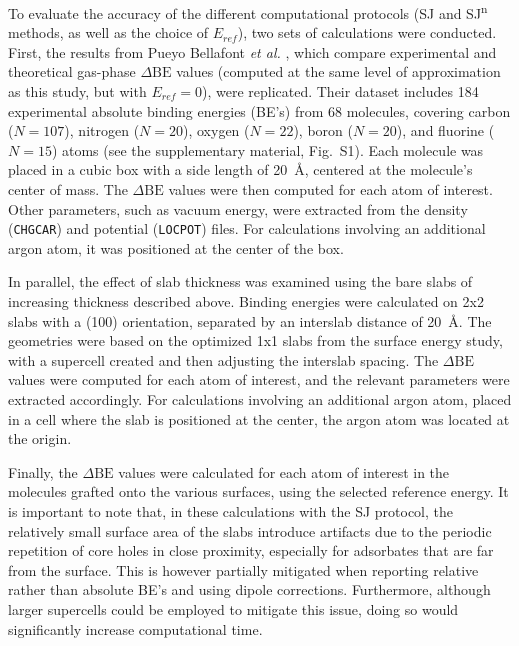 \documentclass[%
aip,
amsmath,amssymb,
preprint,%
jcp,
showkeys,
]{revtex4-2}
\def\dbe{\ensuremath{\Delta\text{BE}}}
\begin{document}
To evaluate the accuracy of the different computational protocols (SJ and SJ\textsuperscript{n} methods, as well as the choice of $E_{ref}$), two sets of calculations were conducted. First, the results from Pueyo Bellafont \textit{et al.} \cite{pueyobellafontPredictingCoreLevel2017}, which compare experimental and theoretical gas-phase \dbe{} values (computed at the same level of approximation as this study, but with $E_{ref}=0$), were replicated. Their dataset includes 184 experimental absolute binding energies (BE's) from 68 molecules, covering carbon ($N=107$), nitrogen ($N=20$), oxygen ($N=22$), boron ($N=20$), and fluorine ($N=15$) atoms (see the supplementary material, Fig.~S1). Each molecule was placed in a cubic box with a side length of \SI{20}{\angstrom}, centered at the molecule's center of mass. The \dbe{} values were then computed for each atom of interest. Other parameters, such as vacuum energy, were extracted from the density (\texttt{CHGCAR}) and potential (\texttt{LOCPOT}) files. For calculations involving an additional argon atom, it was positioned at the center of the box.

In parallel, the effect of slab thickness was examined using the bare slabs of increasing thickness described above. Binding energies were calculated on 2x2 slabs with a (100) orientation, separated by an interslab distance of \SI{20}{\angstrom}. The geometries were based on the optimized 1x1 slabs from the surface energy study, with a supercell created and then adjusting the interslab spacing. The \dbe{} values were computed for each atom of interest, and the relevant parameters were extracted accordingly. For calculations involving an additional argon atom, placed in a cell where the slab is positioned at the center, the argon atom was located at the origin.

Finally, the \dbe{} values were calculated for each atom of interest in the molecules grafted onto the various surfaces, using the selected reference energy. It is important to note that, in these calculations with the SJ protocol, the relatively small surface area of the slabs introduce artifacts due to the periodic repetition of core holes in close proximity, especially for adsorbates that are far from the surface.\cite{taucherFinalStateSimulationsCoreLevel2020} This is however partially mitigated when reporting relative rather than absolute BE's and using dipole corrections. Furthermore, although larger supercells could be employed to mitigate this issue, doing so would significantly increase computational time.
\end{document}
